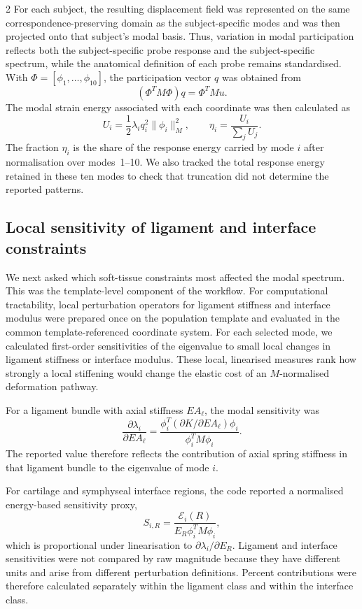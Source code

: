 \documentclass[openacc]{rsproca_new}
\begin{document}
\begin{multicols}{2}
For each subject, the resulting displacement field was represented on the same correspondence-preserving domain as the subject-specific modes and was then projected onto that subject's modal basis. Thus, variation in modal participation reflects both the subject-specific probe response and the subject-specific spectrum, while the anatomical definition of each probe remains standardised. With $\Phi=[\phi_{1},\ldots,\phi_{10}]$, the participation vector $q$ was obtained from
\begin{equation}
(\Phi^{T}M\Phi)q = \Phi^{T}Mu.
\end{equation}
The modal strain energy associated with each coordinate was then calculated as
\begin{equation}
U_{i}=\frac{1}{2}\lambda_{i}q_{i}^{2}\lVert\phi_{i}\rVert_{M}^{2}, \qquad
\eta_{i}=\frac{U_{i}}{\sum_{j}U_{j}}.
\end{equation}
The fraction $\eta_i$ is the share of the response energy carried by mode $i$ after normalisation over modes~1--10. We also tracked the total response energy retained in these ten modes to check that truncation did not determine the reported patterns.

\subsection{Local sensitivity of ligament and interface constraints}

We next asked which soft-tissue constraints most affected the modal spectrum. This was the template-level component of the workflow. For computational tractability, local perturbation operators for ligament stiffness and interface modulus were prepared once on the population template and evaluated in the common template-referenced coordinate system. For each selected mode, we calculated first-order sensitivities of the eigenvalue to small local changes in ligament stiffness or interface modulus. These local, linearised measures rank how strongly a local stiffening would change the elastic cost of an $M$-normalised deformation pathway.

For a ligament bundle with axial stiffness $EA_{\ell}$, the modal sensitivity was
\[
\frac{\partial \lambda_i}{\partial EA_{\ell}} =
\frac{\phi_i^{T}(\partial K/\partial EA_{\ell})\phi_i}
{\phi_i^{T}M\phi_i}.
\]
The reported value therefore reflects the contribution of axial spring stiffness in that ligament bundle to the eigenvalue of mode $i$.

For cartilage and symphyseal interface regions, the code reported a normalised energy-based sensitivity proxy,
\[
S_{i,R} =
\frac{\mathcal{E}_{i}(R)}
{E_R \phi_i^{T}M\phi_i},
\]
which is proportional under linearisation to $\partial \lambda_i/\partial E_R$. Ligament and interface sensitivities were not compared by raw magnitude because they have different units and arise from different perturbation definitions. Percent contributions were therefore calculated separately within the ligament class and within the interface class.


\end{multicols}
\end{document}
